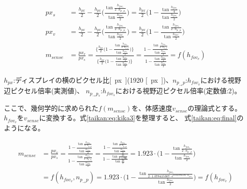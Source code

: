 \begin{align}
  px_s &= \frac{h_{px}}{2} - \frac{h_{px}}{2}\Bigg(\frac{\tan\frac{h_{fov_s}}{2\cdot n_{p_{\to}p_s}}}{\tan{\frac{h_{fov_s}}{2}}}\Bigg) = \frac{h_{px}}{2}\Biggl(1-\frac{\tan{\frac{h_{fov_s}}{4}}}{\tan{\frac{h_{fov_s}}{2}}}\Biggr) \label{taikan:eq:kika1}\\
  px_v &= \frac{h_{px}}{2} - \frac{h_{px}}{2}\Bigg(\frac{\tan\frac{h_{fov_v}}{2\cdot n_{p_{\to}p_v}}}{\tan{\frac{h_{fov_v}}{2}}}\Bigg) = \frac{h_{px}}{2}\Biggl(1-\frac{\tan{\frac{h_{fov_v}}{2\cdot n_{p_{\to}p}}}}{\tan{\frac{h_{fov_v}}{2}}}\Biggr) \label{taikan:eq:kika2}\\
  m_{sense} &= \frac{px_v}{px_s} = \frac{\Biggl\{\frac{h_{px}}{2}\Bigg(1-\frac{\tan\frac{h_{fov_v}}{2\cdot n_{p_{\to}p}}}{\tan\frac{h_{fov_v}}{2}}\Bigg)\Biggr\}}{\Biggl\{\frac{h_{px}}{2}\Bigg(1-\frac{\tan\frac{h_{fov_s}}{4}}{\tan\frac{h_{fov_s}}{2}}\Bigg)\Biggr\}} = \frac{1-\frac{\tan\frac{h_{fov_v}}{2\cdot n_{p_{\to}p}}}{\tan\frac{h_{fov_s}}{2}}}{1-\frac{\tan\frac{h_{fov_s}}{4}}{\tan\frac{h_{fov_s}}{2}}} = f(h_{fov_v}) \label{taikan:eq:kika3}
\end{align}

$h_{px}$:ディスプレイの横のピクセル比\si{[px]}(1920 \si{[px]})、$n_{p_{\to}p}$:$h_{fov_v}$における視野辺ピクセル倍率(実測値)、
$n_{p_{\to}p_s}$:$h_{fov_s}$における視野辺ピクセル倍率(定数値:2)。

ここで、幾何学的に求められた$f(m_{sense})$を、体感速度$v_{sense}$の理論式とする。$h_{fov_v}$を$v_{sense}$に変換する。式\eqref{taikan:eq:kika3}を整理すると、
式\eqref{taikan:eq:final}のようになる。

\begin{equation}
  \begin{split}
    m_{sense} &= \frac{px_v}{px_s} = \frac{1-\frac{\tan\frac{h_{fov_v}}{2\cdot n_{p_{\to}p}}}{\tan\frac{h_{fov_v}}{2}}}{1-\frac{\tan\frac{h_{fov_s}}{2\cdot n_{p_{\to}p_s}}}{\tan\frac{h_{fov_s}}{2}}} = \frac{1-\frac{\tan\frac{h_{fov_v}}{2\cdot n_{p_{\to}p}}}{\tan\frac{h_{fov_v}}{2}}}{1-\frac{\tan\frac{28}{2\cdot 1.986}}{\tan\frac{28}{2}}}=1.923\cdot \Bigg(1 - \frac{\tan\frac{h_{fov_v}}{2\cdot n_{p_{\to}p}}}{\tan\frac{h_{fov_v}}{2}}\Bigg)\\ \label{taikan:eq:final}
    &= f(h_{fov_v}, n_{p_{\to}p}) = 1.923\cdot \Bigg(1 - \frac{\tan\frac{h_{fov_v}}{2\cdot 1.078415307\cdot e^{0.011995591\cdot h_{fov_v}}}}{\tan\frac{h_{fov_v}}{2}}\Bigg) = f(h_{fov_v})
  \end{split}
\end{equation}

